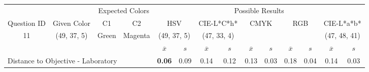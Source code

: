 \begin{table}[H]
  \resizebox{\textwidth}{!} {
  \begin{tabular}{lccccccccccccc}
    \hline
    \multicolumn{1}{c}{}                              &                                      & \multicolumn{2}{c}{Expected Colors}                   & \multicolumn{10}{c}{Possible Results}                                                                                                                                                                                                                                                                                        \\ \cline{3-14}
    \multicolumn{1}{c}{\multirow{-2}{*}{Question ID}} & \multirow{-2}{*}{Given Color}        & C1                       & C2                         & \multicolumn{2}{c}{HSV}                                        & \multicolumn{2}{c}{CIE-L*C*h*}                                 & \multicolumn{2}{c}{CMYK}                                       & \multicolumn{2}{c}{RGB}                                        & \multicolumn{2}{c}{CIE-L*a*b*}                                 \\ \hline
    \multicolumn{1}{c}{11}                             & \cellcolor[HTML]{FF8000}(49, 37, 5) & \multicolumn{1}{c|}{Green} & \multicolumn{1}{c|}{Magenta}  & \multicolumn{2}{c|}{\cellcolor[HTML]{FF8000}(49, 37, 5)}      & \multicolumn{2}{c|}{\cellcolor[HTML]{FF6F00}(47, 33, 4)}       & \multicolumn{2}{c|}{\cellcolor[HTML]{808080}{\color[HTML]{FFFFFF}(21, 22, 24)}}       & \multicolumn{2}{c|}{\cellcolor[HTML]{808080}{\color[HTML]{FFFFFF}(21, 22, 24)}}       & \multicolumn{2}{c|}{\cellcolor[HTML]{C9B2A2}(47, 48, 41)}       \\ \hline
                                                      & \multicolumn{1}{l}{}                 & \multicolumn{1}{l}{}     & \multicolumn{1}{l}{}       & \multicolumn{1}{c}{$\overline{x}$} & \multicolumn{1}{c}{$s$} & \multicolumn{1}{c}{$\overline{x}$} & \multicolumn{1}{c}{$s$} & \multicolumn{1}{c}{$\overline{x}$} & \multicolumn{1}{c}{$s$} & \multicolumn{1}{c}{$\overline{x}$} & \multicolumn{1}{c}{$s$} & \multicolumn{1}{c}{$\overline{x}$} & \multicolumn{1}{c}{$s$} \\ \hline
    \multicolumn{4}{l}{Distance to Objective - Laboratory}                                                                                           & \multicolumn{1}{|c}{\textbf{0.06}}       & \multicolumn{1}{c|}{0.09}    & \multicolumn{1}{|c}{0.14}       & \multicolumn{1}{c|}{0.12}    & \multicolumn{1}{|c}{0.13}       & \multicolumn{1}{c|}{0.03}    & \multicolumn{1}{|c}{0.18}       & \multicolumn{1}{c|}{0.04}    & \multicolumn{1}{|c}{0.14}       & \multicolumn{1}{c|}{0.03}    \\

\end{tabular}}
\end{table}
